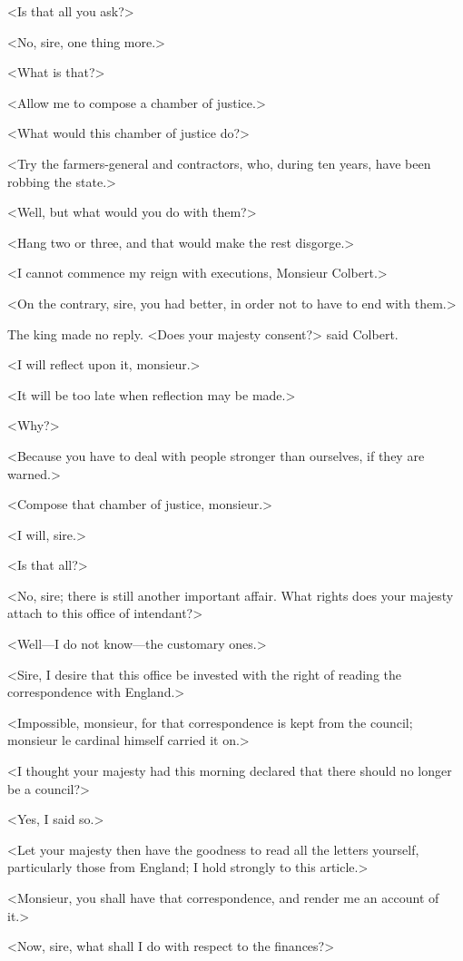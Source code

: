 <Is that all you ask?>

<No, sire, one thing more.>

<What is that?>

<Allow me to compose a chamber of justice.>

<What would this chamber of justice do?>

<Try the farmers-general and contractors, who, during ten years, have been robbing the state.>

<Well, but what would you do with them?>

<Hang two or three, and that would make the rest disgorge.>

<I cannot commence my reign with executions, Monsieur Colbert.>

<On the contrary, sire, you had better, in order not to have to end with them.>

The king made no reply. <Does your majesty consent?> said Colbert.

<I will reflect upon it, monsieur.>

<It will be too late when reflection may be made.>

<Why?>

<Because you have to deal with people stronger than ourselves, if they are warned.>

<Compose that chamber of justice, monsieur.>

<I will, sire.>

<Is that all?>

<No, sire; there is still another important affair. What rights does your majesty attach to this office of intendant?>

<Well—I do not know—the customary ones.>

<Sire, I desire that this office be invested with the right of reading the correspondence with England.>

<Impossible, monsieur, for that correspondence is kept from the council; monsieur le cardinal himself carried it on.>

<I thought your majesty had this morning declared that there should no longer be a council?>

<Yes, I said so.>

<Let your majesty then have the goodness to read all the letters yourself, particularly those from England; I hold strongly to this article.>

<Monsieur, you shall have that correspondence, and render me an account of it.>

<Now, sire, what shall I do with respect to the finances?>


